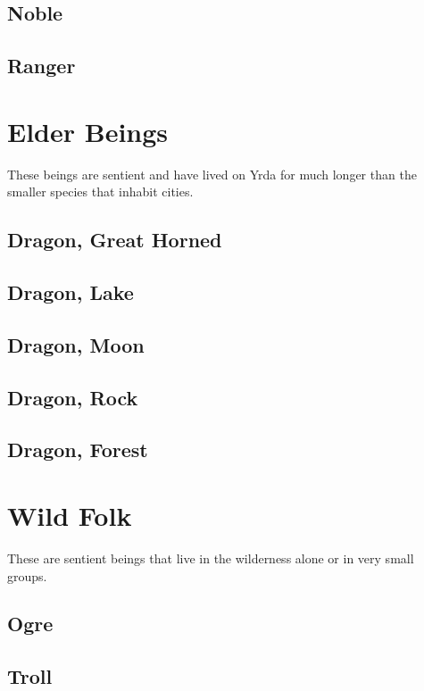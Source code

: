 \begin{multicols}{2}
\subsection{Noble}

\subsection{Ranger}

\section{Elder Beings}

These beings are sentient and have lived on Yrda for much
longer than the smaller species that inhabit cities.

\subsection{Dragon, Great Horned}

\subsection{Dragon, Lake}

\subsection{Dragon, Moon}

\subsection{Dragon, Rock}

\subsection{Dragon, Forest}

\section{Wild Folk}

These are sentient beings that live in the wilderness alone or
in very small groups.

\subsection{Ogre}

\subsection{Troll}

\end{multicols}
